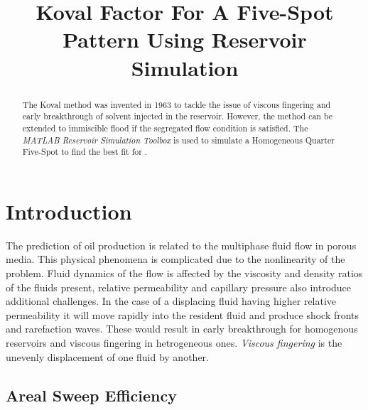 \documentclass[barcolor=BrickRed,nocopyright,nolists]{asmejour}
\begin{document}

\title{Koval Factor For A Five-Spot Pattern Using Reservoir Simulation}

   
\begin{abstract}
	The Koval method was invented in 1963 to tackle the issue of viscous fingering and early breakthrough
	of solvent injected in the reservoir. However, the method can be extended to immiscible flood if the 
	segregated flow condition is satisfied. 
	The \textit{MATLAB Reservoir Simulation Toolbox} is used to simulate a Homogeneous Quarter Five-Spot 
	to find the best fit for .
\end{abstract}
							
\maketitle %


\section{Introduction}
The prediction of oil production is related to the multiphase fluid flow in porous media. This physical phenomena
is complicated due to the nonlinearity of the problem. Fluid dynamics of the flow is affected by the viscosity
and density ratios of the fluids present, relative permeability and capillary pressure also introduce additional challenges.
In the case of a displacing fluid having higher relative permeability it will move rapidly into the resident fluid and produce
shock fronts and rarefaction waves. These would result in early breakthrough for homogenous reservoirs and viscous fingering in 
hetrogeneous ones. \textit{Viscous fingering} is the unevenly displacement of one fluid by another. 

\subsection{Areal Sweep Efficiency}
\end{document}
